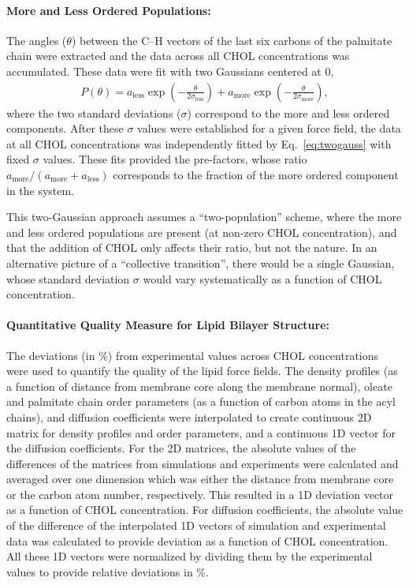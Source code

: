 \documentclass[aps,prl,superscriptaddress]{revtex4-2}
\begin{document}
\paragraph{More and Less Ordered Populations:} The angles ($\theta$) between the C--H vectors of the last six carbons of the palmitate chain were extracted and the data across all CHOL concentrations was accumulated. These data were fit with two Gaussians centered at 0,
%
\begin{align}
    P(\theta)=a_\mathrm{less}\exp\left(-\frac{\theta}{2\sigma_\mathrm{less}}\right)+a_\mathrm{more}\exp\left(-\frac{\theta}{2\sigma_\mathrm{more}}\right),
    \label{eq:twogauss}
\end{align}
%
where the two standard deviations ($\sigma$) correspond to the more and less ordered components. After these $\sigma$ values were established for a given force field, the data at all CHOL concentrations was independently fitted by Eq.~\eqref{eq:twogauss} with fixed $\sigma$ values. These fits provided the pre-factors, whose ratio $a_\mathrm{more}/(a_\mathrm{more}+a_\mathrm{less})$ corresponds to the fraction of the more ordered component in the system. 

This two-Gaussian approach assumes a ``two-population'' scheme, where the more and less ordered populations are present (at non-zero CHOL concentration), and that the addition of CHOL only affects their ratio, but not the nature. In an alternative picture of a ``collective transition'', there would be a single Gaussian, whose standard deviation $\sigma$ would vary systematically as a function of CHOL concentration.

\paragraph{Quantitative Quality Measure for Lipid Bilayer Structure:} The deviations (in \%) from experimental values across CHOL concentrations were used to quantify the quality of the lipid force fields. The density profiles (as a function of distance from membrane core along the membrane normal), oleate and palmitate chain order parameters (as a function of carbon atoms in the acyl chains), and diffusion coefficients were interpolated to create continuous 2D matrix for density profiles and order parameters, and a continuous 1D vector for the diffusion coefficients. For the 2D matrices, the absolute values of the differences of the matrices from simulations and experiments were calculated and averaged over one dimension which was either the distance from membrane core or the carbon atom number, respectively. This resulted in a 1D deviation vector as a function of CHOL concentration. For diffusion coefficients, the absolute value of the difference of the interpolated 1D vectors of simulation and experimental data was calculated to provide deviation as a function of CHOL concentration. All these 1D vectors were normalized by dividing them by the experimental values to provide relative deviations in \%.
\end{document}
